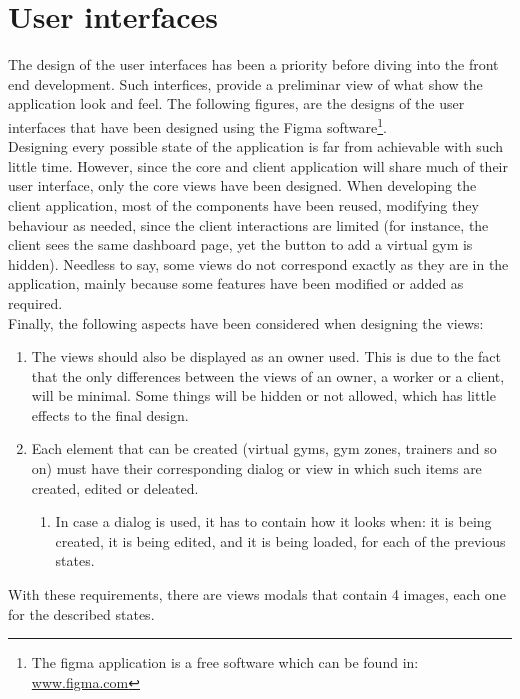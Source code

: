 \documentclass[a4paper, 12pt, oneside]{book}
\begin{document}
\section{User interfaces}
The design of the user interfaces has been a priority before diving into the front end development. Such interfices, provide a preliminar view of what show the application look and feel. The following figures, are the designs of the user interfaces that have been designed using the Figma software\footnote{The figma application is a free software which can be found in: \href{www.figma.com}{www.figma.com}}.
\\
Designing every possible state of the application is far from achievable with such little time. However, since the core and client application will share much of their user interface, only the core views have been designed. When developing the client application, most of the components have been reused, modifying they behaviour as needed, since the client interactions are limited (for instance, the client sees the same dashboard page, yet the button to add a virtual gym is hidden). Needless to say, some views do not correspond exactly as they are in the application, mainly because some features have been modified or added as required.
\\
Finally, the following aspects have been considered when designing the views:
\begin{enumerate}[label = -]
	\item The views should also be displayed as an owner used. This is due to the fact that the only differences between the views of an owner, a worker or a client, will be minimal. Some things will be hidden or not allowed, which has little effects to the final design.
	\item Each element that can be created (virtual gyms, gym zones, trainers and so on) must have their corresponding dialog or view in which such items are created, edited or deleated.
	      \begin{enumerate}[label = -]
		      \item In case a dialog is used, it has to contain how it looks when: it is being created, it is being edited, and it is being loaded, for each of the previous states.
	      \end{enumerate}
\end{enumerate}
With these requirements, there are views modals that contain 4 images, each one for the described states.
\\
\end{document}
